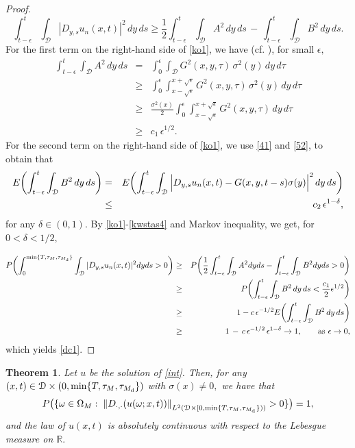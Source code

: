 \documentclass[reqno]{amsart}
\numberwithin{equation}{section}
\newtheorem{theorem}{Theorem}[section]
\newcommand{\Om}{\Omega}
\newcommand{\om}{\omega}
\newcommand{\cd}{\mathcal{D}}
\begin{document}
\begin{proof}
\begin{equation}\label{ko1}
\int_{t-\epsilon}^t\int_{\mathcal{D}}|D_{y,s}u_n(x,t)|^2\,dy\,ds
\geq
\frac12\int_{t-\epsilon}^t \int_{\mathcal{D}}A^2\, dy\,ds
\,-\,
\int_{t-\epsilon}^t\int_{\mathcal{D}}B^2\,dy\,ds .
\end{equation}
For the first term on the right-hand side of \eqref{ko1}, we have (cf. \cite[Lemma B.2.3]{DS}), for small $\epsilon,$
\begin{eqnarray}\label{kwstas1}
\int_{t-\epsilon}^t \int_{\mathcal{D}}A^2\, dy\,ds
&=&
\int_0^\epsilon\int_{\cd}G^2(x,y,\tau)\,\sigma^2(y)\,dy\,d\tau 
\nonumber
\\
&\geq&
\int_0^\epsilon\int_{x-\sqrt{\epsilon}}^{x+\sqrt{\epsilon}}G^2(x,y,\tau)\,\sigma^2(y)\,dy\,d\tau
\nonumber
\\
&\geq&
\frac{\sigma^2(x)}{2}\int_0^\epsilon\int_{x-\sqrt{\epsilon}}^{x+\sqrt{\epsilon}}G^2(x,y,\tau)\,dy\,d\tau
\nonumber
\\
& \geq & c_1\, \epsilon^{1/2}.
\end{eqnarray}
For the second term on the right-hand side of \eqref{ko1}, we use \eqref{41} and \eqref{52}, to obtain that
\begin{eqnarray}
E\biggl{(}\int_{t-\epsilon}^t\int_{\cd}B^2\,dy\,ds\biggr{)}&=&
E\biggl{(}\int_{t-\epsilon}^t\int_{\cd}\Big{|}D_{y,s}u_n(x,t)-G(x,y,t-s)\sigma(y)\Big{|}^2\,dy\,ds\biggr{)}
\nonumber\\
&\leq&
c_2\,\epsilon^{1-\delta} ,\label{kwstas4}
\end{eqnarray}
for any $\delta \in (0,1). $ By \eqref{ko1}-\eqref{kwstas4} and Markov inequality, we get, for $ 0<\delta<1/2,$

\begin{eqnarray*}
P\biggl{(}\int_0^{\min\{T,\tau_M,\tau_{M_{\rm d}}\}}\int_{\cd}|D_{y,s}u_n(x,t)|^2dyds>0\biggr{)}
&\geq&
P\biggl{(}\frac12\int_{t-\epsilon}^t\int_{\cd}A^2 dyds-
\int_{t-\epsilon}^t\int_{\cd}B^2 dyds>0\biggr{)}
\\
&\geq&
P\biggl{(}\int_{t-\epsilon}^t\int_{\cd}B^2\, dy\,ds<\frac{c_1}{2}\epsilon^{1/2}\biggr{)}
\\
&\geq&
1-c\,\epsilon^{-1/2}E\biggl{(}\int_{t-\epsilon}^t\int_{\cd}B^2\,dy\,ds\biggr{)}
\\
&\geq&
1\,-\,c\,\epsilon^{-1/2}\,\epsilon^{1-\delta} \rightarrow 1, \qquad \text{as}\ \epsilon\rightarrow 0 ,
\end{eqnarray*}
which yields \eqref{dc1}.
\end{proof}


\begin{theorem}\label{thmkostas}Let $u$ be the solution of \eqref{int}. Then, for any $(x,t)\in \cd \times (0,\min\{T,\tau_M,\tau_{M_{\rm d}}\}) $ with $\sigma(x)\neq 0, $ we have that
\begin{equation*}
P\big(\{\om\in\Om_M:\; \left\|D_{\cdot,\cdot}(u(\om;x,t))\right\|_{L^2(\cd\times[0,\min\{T,\tau_M,\tau_{M_{\rm d}}\}))}>0\}\big)=1,
\end{equation*}
and the law of $ u(x,t) $ is absolutely continuous with respect to the Lebesgue measure on $\mathbb R.$
\end{theorem}
\end{document}
